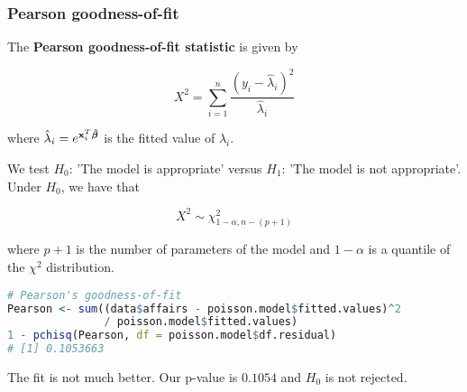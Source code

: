 \documentclass[border=5mm, convert, usenames, dvipsnames,beamer]{standalone}
\begin{document}
\begin{frame}[ fragile]{}
\frametitle{Pearson goodness-of-fit}

\footnotesize
\vspace{15mm}
\noindent
The \textbf{Pearson goodness-of-fit statistic}  is given by

$$
X^{2} = \sum_{i=1}^{n} \frac{(y_{i} -\hat{ \lambda}_{i})^{2}}{\hat{\lambda}_{i}}
$$

\noindent
where $\hat{\lambda}_{i} =  e^{ \bold{x}_{i}^{T} \boldsymbol{\hat{\beta}}}$ is the fitted value of $\lambda_{i}$.


\vspace{3mm}
\noindent
 We test $H_{0}$: 'The model is appropriate' versus $H_{1}$: 'The model is not appropriate'. Under $H_{0}$, we have that

$$
X^{2} \sim \chi_{1-\alpha, n-(p+1)}^{2}
$$

\vspace{2mm}
\noindent
where $p+1$ is the number of parameters of the model and $1-\alpha$ is a quantile of the $\chi^{2}$ distribution.
\par 

\tiny
\begin{lstlisting}[language=R]
# Pearson's goodness-of-fit
Pearson <- sum((data$affairs - poisson.model$fitted.values)^2 
               / poisson.model$fitted.values)
1 - pchisq(Pearson, df = poisson.model$df.residual)
# [1] 0.1053663
\end{lstlisting}
\par

\footnotesize
\vspace{2mm}
\noindent
{\color{purple}The fit is not much better.} Our p-value is $0.1054$ and $H_{0}$ is not rejected.

\par
\end{frame}
\end{document}
